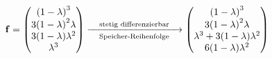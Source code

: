 \documentclass{article}
\begin{document}
\begin{align*}
    \vbasis = 
    \begin{pmatrix}
        \qty(1 - \lambda)^3 \\
        3 \qty(1 - \lambda)^2 \lambda \\
        3 \qty(1 - \lambda) \lambda^2 \\
        \lambda^3
    \end{pmatrix}
    \xrightarrow[\qq{Speicher-Reihenfolge}]{\qq{stetig differenzierbar}}
    \begin{pmatrix}
        \qty(1 - \lambda)^3 \\
        3 \qty(1 - \lambda)^2 \lambda \\
        \lambda^3 + 3 \qty(1 - \lambda) \lambda^2 \\
        6 \qty(1 - \lambda) \lambda^2
    \end{pmatrix}
\end{align*}
\end{document}
